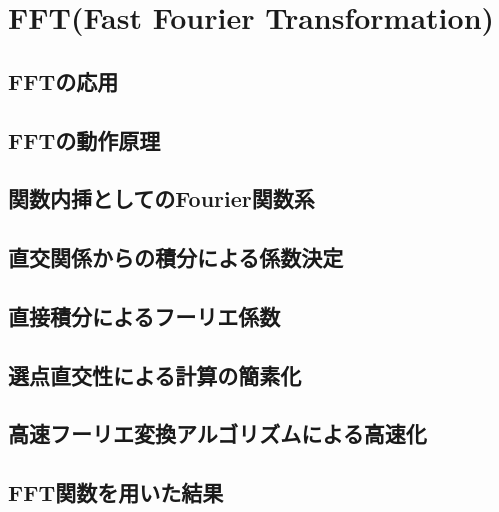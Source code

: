 \documentclass[10pt,a4j]{jreport}
\begin{document}
\chapter{FFT(Fast Fourier Transformation)}
\section{FFTの応用}

\section{FFTの動作原理}

\section{関数内挿としてのFourier関数系}

\section{直交関係からの積分による係数決定}

\section{直接積分によるフーリエ係数}

\section{選点直交性による計算の簡素化}

\section{高速フーリエ変換アルゴリズムによる高速化}

\section{FFT関数を用いた結果}

\end{document}
